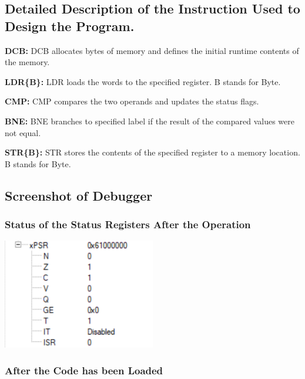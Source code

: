 \documentclass{article}
\begin{document}
\subsection{Detailed Description of the Instruction Used to Design the Program.}

\item \textbf{DCB: }DCB allocates bytes of memory and defines the initial runtime contents of the memory.
\item \textbf{LDR\{B\}: }LDR loads the words to the specified register. B stands for Byte.
\item \textbf{CMP: }CMP compares the two operands and updates the status flags.
\item \textbf{BNE: }BNE branches to specified label if the result of the compared values were not equal.
\item \textbf{STR\{B\}: }STR stores the contents of the specified register to a memory location. B stands for Byte.

\subsection{Screenshot of Debugger}

\subsubsection{Status of the Status Registers After the Operation}

\begin{center}
    \includegraphics[width=0.5\textwidth]{task_iv_A_PSR.png}
\end{center}

\subsubsection{After the Code has been Loaded}
\end{document}
